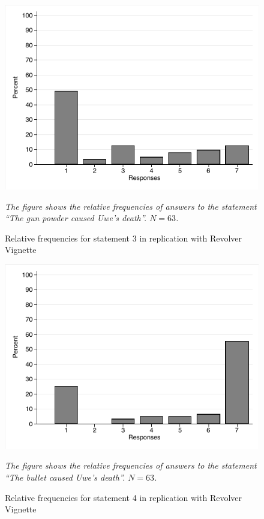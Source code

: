 \documentclass[egregdoesnotlikesansseriftitles,12pt]{scrartcl}
\begin{document}
\begin{figure}[H]
   \centering
   \includegraphics[scale=0.8]{figures/rev_rep_hist_3.pdf}
   \begin{minipage}{0.9\linewidth}
   \footnotesize
   \emph{The figure shows the relative frequencies of answers to the statement ``The gun powder caused Uwe's death''. $N=63$.}
   \end{minipage}
   \caption{Relative frequencies for statement 3 in replication with Revolver Vignette}
   \label{fig:rev_rep_hist_3}
\end{figure}

\begin{figure}[H]
   \centering
   \includegraphics[scale=0.8]{figures/rev_rep_hist_4.pdf}
   \begin{minipage}{0.9\linewidth}
   \footnotesize
   \emph{The figure shows the relative frequencies of answers to the statement ``The bullet caused Uwe's death''. $N=63$.}
   \end{minipage}
   \caption{Relative frequencies for statement 4 in replication with Revolver Vignette}
   \label{fig:rev_rep_hist_4}
\end{figure}
\end{document}
